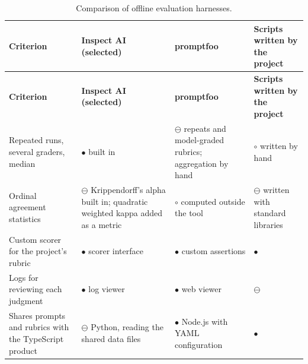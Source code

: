{\small
\begin{longtable}{|>{\raggedright\arraybackslash}p{}|>{\raggedright\arraybackslash}p{}|>{\raggedright\arraybackslash}p{}|>{\raggedright\arraybackslash}p{}|}
\caption{Comparison of offline evaluation harnesses.} \\
\hline
\textbf{Criterion} & \textbf{Inspect AI (selected)\cite{r129}} & \textbf{promptfoo\cite{r198}} & \textbf{Scripts written by the project} \\ \hline
\endfirsthead
\hline
\textbf{Criterion} & \textbf{Inspect AI (selected)\cite{r129}} & \textbf{promptfoo\cite{r198}} & \textbf{Scripts written by the project} \\ \hline
\endhead
Repeated runs, several graders, median & $\bullet$ built in & $\ominus$ repeats and model-\allowbreak{}graded rubrics; aggregation by hand & $\circ$ written by hand \\ \hline
Ordinal agreement statistics & $\ominus$ Krippendorff's alpha built in; quadratic weighted kappa added as a metric & $\circ$ computed outside the tool & $\ominus$ written with standard libraries \\ \hline
Custom scorer for the project's rubric & $\bullet$ scorer interface & $\bullet$ custom assertions & $\bullet$ \\ \hline
Logs for reviewing each judgment & $\bullet$ log viewer & $\bullet$ web viewer & $\ominus$ \\ \hline
Shares prompts and rubrics with the TypeScript product & $\ominus$ Python, reading the shared data files & $\bullet$ Node.js with YAML configuration & $\bullet$ \\ \hline
\end{longtable}
}

